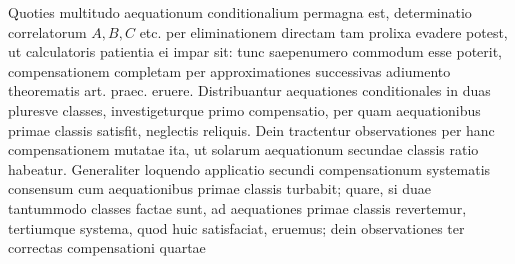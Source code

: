 Quoties multitudo aequationum conditionalium permagna est, determinatio correlatorum \(A,B,C\) etc. per eliminationem directam tam prolixa evadere potest, ut calculatoris patientia ei impar sit: tunc saepenumero commodum esse poterit, compensationem completam per approximationes successivas adiumento theorematis art. praec. eruere. Distribuantur aequationes conditionales in duas pluresve classes, investigeturque primo compensatio, per quam aequationibus primae classis satisfit, neglectis reliquis. Dein tractentur observationes per hanc compensationem mutatae ita, ut solarum aequationum secundae classis ratio habeatur. Generaliter loquendo applicatio secundi compensationum systematis consensum cum aequationibus primae classis turbabit; quare, si duae tantummodo classes factae sunt, ad aequationes primae classis revertemur, tertiumque systema, quod huic satisfaciat, eruemus; dein observationes ter correctas compensationi quartae
